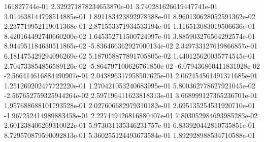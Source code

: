 161827744e-01	2.329271878234653870e-01	3.740281626619447741e-01	3.014638144798514885e-01	1.891183423892978388e-01	8.960130628052591362e-02	2.237719952119011368e-01	2.871553371934533194e-01	1.116513083019506636e-01	8.420164492740660200e-02	1.645352711500724097e-01	3.885903276564292574e-01	8.944951184630511865e-02	-5.836466362927000134e-02	2.349733127619866857e-01	6.181475429294096269e-02	5.187058877891705805e-02	1.440125620035774545e-01	2.704733854856589126e-02	-5.864797100626761850e-02	-6.079436860411831928e-02	-2.566414616884490907e-01	2.043896317958507625e-01	2.062454561491371685e-01	1.251269202477722220e-01	1.270421053240683995e-01	5.800362778627921045e-02	-2.567652759325944264e-02	2.597196411623818313e-01	3.668999127365236701e-01	1.957688688101793528e-01	2.027606682979310182e-01	2.695135254531920710e-01	-1.967252414989883458e-01	2.227449426816880407e-01	7.803052984693985283e-02	2.601238406269310022e-01	5.973031135346231757e-01	6.833920442810735851e-01	8.729570879590092813e-01	5.360255124493673584e-01	1.892928988534710588e-01
